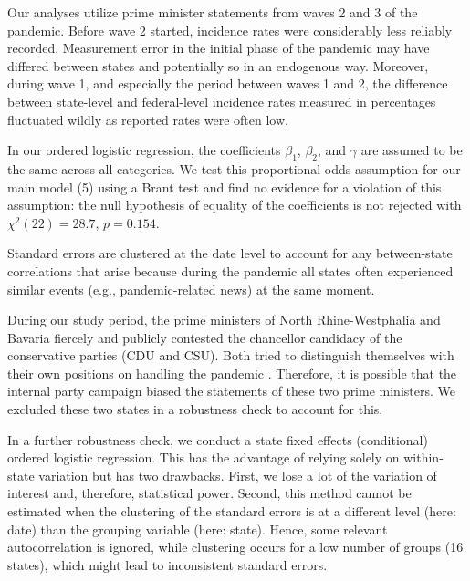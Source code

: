 \documentclass[authoryear,12pt, 3p]{elsarticle}
\theoremstyle{break}
\begin{document}
Our analyses utilize prime minister statements from waves 2 and 3 of the pandemic. Before wave 2 started, incidence rates were considerably less reliably recorded. Measurement error in the initial phase of the pandemic may have differed between states and potentially so in an endogenous way. Moreover, during wave 1, and especially the period between waves 1 and 2, the difference between state-level and federal-level incidence rates measured in percentages fluctuated wildly as reported rates were often low.

In our ordered logistic regression, the coefficients $\beta_1$, $\beta_2$, and $\gamma$ are assumed to be the same across all categories. We test this proportional odds assumption for our main model (5) using a Brant test \citep{Brant1990} and find no evidence for a violation of this assumption: the null hypothesis of equality of the coefficients is not rejected with $\chi^2 (22) = 28.7$, $p = 0.154$. 

Standard errors are clustered at the date level to account for any between-state correlations that arise because during the pandemic all states often experienced similar events (e.g., pandemic-related news) at the same moment.  

During our study period, the prime ministers of North Rhine-Westphalia and Bavaria fiercely and publicly contested the chancellor candidacy of the conservative parties (CDU and CSU). Both tried to distinguish themselves with their own positions on handling the pandemic \citep{Jun2023}. Therefore, it is possible that the internal party campaign biased the statements of these two prime ministers. We excluded these two states in a robustness check to account for this.

In a further robustness check, we conduct a state fixed effects (conditional) ordered logistic regression. This has the advantage of relying solely on within-state variation but has two drawbacks. First, we lose a lot of the variation of interest and, therefore, statistical power. Second, this method cannot be estimated when the clustering of the standard errors is at a different level (here: date) than the grouping variable (here: state). Hence, some relevant autocorrelation is ignored, while clustering occurs for a low number of groups (16 states), which might lead to inconsistent standard errors.
\end{document}
